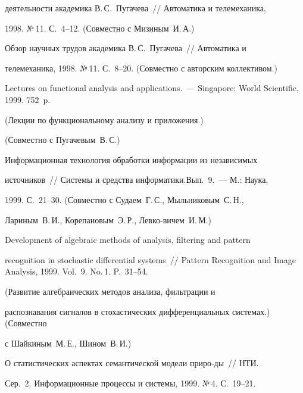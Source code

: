деятельности академика В.\,С.~Пугачева~// Автоматика и телемеханика,


1998. №\,11. С.~4--12. (Совместно с Мизиным~И.\,А.)





 Обзор научных трудов академика В.\,С.~Пугачева~// Автоматика и


телемеханика, 1998. №\,11. С.~8--20. (Совместно с авторским коллективом.)










 Lectures on functional analysis and applications.~--- Singapore: World Scientific, 1999. 752~p.


(Лекции по функциональному анализу и приложения.)


 (Совместно с Пугачевым~В.\,С.)





 Информационная технология обработки информации из независимых


источников~// Системы и средства информатики.\linebreak Вып.~9.~--- М.: Наука,


1999. С.~21--30. (Совместно с Судаем~Г.\,С., Мыльниковым~С.\,Н.,


Лариным~В.\,И., Корепановым~Э.\,Р., Левко-\linebreak вичем~И.\,М.)





Development of algebraic methods of analysis, filtering and pattern


recognition in stochastic differential systems~// Pattern Recognition and Image Analysis, 1999. Vol.~9. No.\,1. P.~31--54.


(Развитие алгебраических методов анализа, фильтрации и


распознавания сигналов в стохастических дифференциальных системах.) (Совместно


с Шайкиным~М.\,Е., Шином~В.\,И.)





 О статистических аспектах семантической модели при\-ро-\linebreak ды~// НТИ.


Сер.~2. Информационные процессы и системы, 1999. №\,4. С.~19--21.





